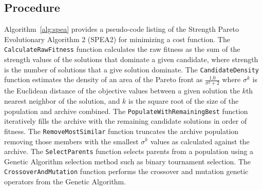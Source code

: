 \subsection{Procedure}
Algorithm~\ref{alg:spea} provides a pseudo-code listing of the Strength Pareto Evolutionary Algorithm 2 (SPEA2) for minimizing a cost function. 
The \texttt{CalculateRawFitness} function calculates the raw fitness as the sum of the strength values of the solutions that dominate a given candidate, where strength is the number of solutions that a give solution dominate.
The \texttt{CandidateDensity} function estimates the density of an area of the Pareto front as $\frac{1.0}{\sigma^k + 2}$ where $\sigma^k$ is the Euclidean distance of the objective values between a given solution the $k$th nearest neighbor of the solution, and $k$ is the square root of the size of the population and archive combined.
The \texttt{PopulateWithRemainingBest} function iteratively fills the archive with the remaining candidate solutions in order of fitness.
The \texttt{RemoveMostSimilar} function truncates the archive population removing those members with the smallest $\sigma^k$ values as calculated against the archive.
The \texttt{SelectParents} function selects parents from a population using a Genetic Algorithm selection method such as binary tournament selection. The \texttt{CrossoverAndMutation} function performs the crossover and mutation genetic operators from the Genetic Algorithm.

